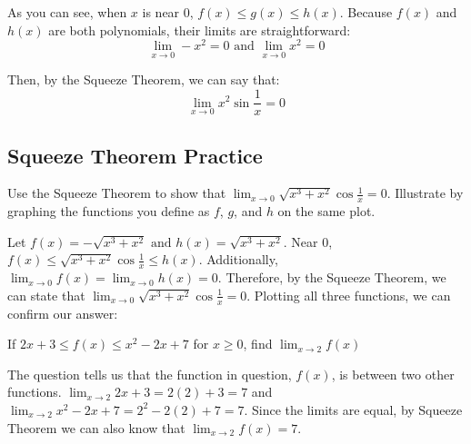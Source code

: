 As you can see, when $x$ is near $0$, $f(x) \leq g(x) \leq h(x)$. Because $f(x)$ 
and $h(x)$ are both polynomials, their limits are straightforward: $$\lim_{x \to 
0}-x^2 = 0 \text{ and } \lim_{x \to 0}x^2 = 0$$

Then, by the Squeeze Theorem, we can say that: $$\lim_{x \to 0}x^2\sin{\frac{1}{x}}
=0$$

\subsection{Squeeze Theorem Practice}

\begin{Exercise}
[title=Squeeze Theorem 1, label=squeeze1]
    Use the Squeeze Theorem to show that $\lim_{x \to 0}\sqrt{x^3 + x^2}
    \cos{\frac{1}{x}} = 0$. Illustrate by graphing the functions you define as 
    $f$, $g$, and $h$ on the same plot.
    \vspace{100mm}
\end{Exercise}
\begin{Answer}
    [ref=squeeze1]
    Let $f(x) = -\sqrt{x^3+x^2} \text{ and } h(x) = \sqrt{x^3+x^2}$. Near $0$, 
    $f(x) \leq \sqrt{x^3 + x^2}\cos{\frac{1}{x}} \leq h(x)$. Additionally, 
    $\lim_{x \to 0}f(x) = \lim_{x \to 0}h(x) = 0$. Therefore, by the Squeeze 
    Theorem, we can state that $\lim_{x \to 0}\sqrt{x^3 + x^2}\cos{\frac{1}{x}} 
    = 0$. Plotting all three functions, we can confirm our answer:

\end{Answer}

\begin{Exercise}
    [title=Squeeze Theorem 2, label=squeeze2]
    If $2x+3 \leq f(x) \leq x^2-2x+7$ for $x \geq 0$, find $\lim_{x \to 2}f(x)$
    \vspace{40mm}
\end{Exercise}
\begin{Answer}
    [ref=squeeze2]
    The question tells us that the function in question, $f(x)$, is between 
    two other functions. $\lim_{x \to 2}2x+3 = 2(2)+3 = 7$ and $\lim_{x \to 2} 
    x^2 - 2x + 7 = 2^2 - 2(2) + 7 = 7$. Since the limits are equal, by Squeeze 
    Theorem we can also know that $\lim_{x \to 2}f(x) = 7$.
\end{Answer}


